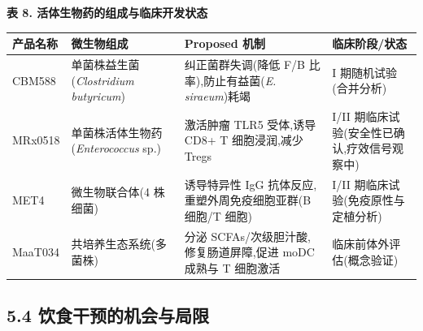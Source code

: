\textbf{表 8. 活体生物药的组成与临床开发状态}

{\def\LTcaptype{none} %
\begin{longtable}[]{@{}
  >{\raggedright\arraybackslash}p{}
  >{\raggedright\arraybackslash}p{}
  >{\raggedright\arraybackslash}p{}
  >{\raggedright\arraybackslash}p{}@{}}
\toprule\noalign{}
\begin{minipage}[b]{\linewidth}\raggedright
产品名称
\end{minipage} & \begin{minipage}[b]{\linewidth}\raggedright
微生物组成
\end{minipage} & \begin{minipage}[b]{\linewidth}\raggedright
Proposed 机制
\end{minipage} & \begin{minipage}[b]{\linewidth}\raggedright
临床阶段/状态
\end{minipage} \\
\midrule\noalign{}
\endhead
\bottomrule\noalign{}
\endlastfoot
CBM588 & 单菌株益生菌 (\emph{Clostridium butyricum}) & 纠正菌群失调(降低 F/B 比率),防止有益菌(\emph{E. siraeum})耗竭 & I 期随机试验(合并分析) \\
MRx0518 & 单菌株活体生物药 (\emph{Enterococcus} sp.) & 激活肿瘤 TLR5 受体,诱导 CD8+ T 细胞浸润,减少 Tregs & I/II 期临床试验(安全性已确认,疗效信号观察中) \\
MET4 & 微生物联合体(4 株细菌) & 诱导特异性 IgG 抗体反应,重塑外周免疫细胞亚群(B 细胞/T 细胞) & I/II 期临床试验(免疫原性与定植分析) \\
MaaT034 & 共培养生态系统(多菌株) & 分泌 SCFAs/次级胆汁酸,修复肠道屏障,促进 moDC 成熟与 T 细胞激活 & 临床前体外评估(概念验证) \\
\end{longtable}
}

\subsection{5.4 饮食干预的机会与局限}\label{ux996eux98dfux5e72ux9884ux7684ux673aux4f1aux4e0eux5c40ux9650}


